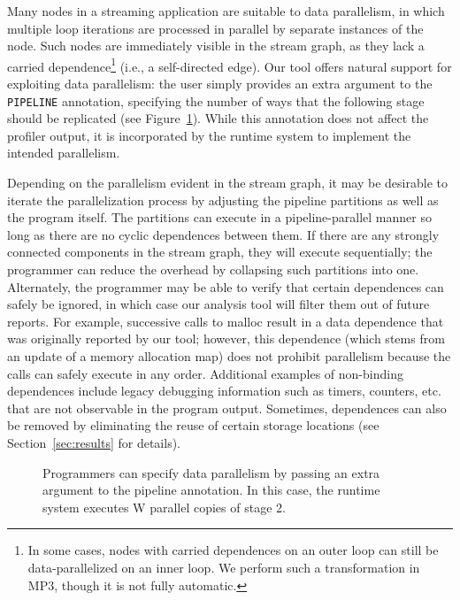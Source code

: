 Many nodes in a streaming application are suitable to data
parallelism, in which multiple loop iterations are processed in
parallel by separate instances of the node.  Such nodes are
immediately visible in the stream graph, as they lack a carried
dependence\footnote{In some cases, nodes with carried dependences on
  an outer loop can still be data-parallelized on an inner loop.  We
  perform such a transformation in MP3, though it is not fully
  automatic.} (i.e., a self-directed edge).  Our tool offers natural
support for exploiting data parallelism: the user simply provides an
extra argument to the {\tt PIPELINE} annotation, specifying the number
of ways that the following stage should be replicated (see
Figure~\ref{fig:data-parallelism}).  While this annotation does not
affect the profiler output, it is incorporated by the runtime system
to implement the intended parallelism.

Depending on the parallelism evident in the stream graph, it may be
desirable to iterate the parallelization process by adjusting the
pipeline partitions as well as the program itself.  The partitions can
execute in a pipeline-parallel manner so long as there are no cyclic
dependences between them.  If there are any strongly connected
components in the stream graph, they will execute sequentially; the
programmer can reduce the overhead by collapsing such partitions into
one.  Alternately, the programmer may be able to verify that certain
dependences can safely be ignored, in which case our analysis tool
will filter them out of future reports.  For example, successive calls
to malloc result in a data dependence that was originally reported by
our tool; however, this dependence (which stems from an update of a
memory allocation map) does not prohibit parallelism because the calls
can safely execute in any order.  Additional examples of non-binding
dependences include legacy debugging information such as timers,
counters, etc. that are not observable in the program output.
Sometimes, dependences can also be removed by eliminating the reuse of
certain storage locations (see Section~\ref{sec:results} for details).

\begin{figure}[t]
\centering
{}
\vspace{-6pt}
\caption[Specifying data parallelism]{Programmers can specify data
  parallelism by passing an extra argument to the pipeline annotation.
  In this case, the runtime system executes W parallel copies of stage
  2.  \protect\label{fig:data-parallelism}}
\vspace{-6pt}
\end{figure}

